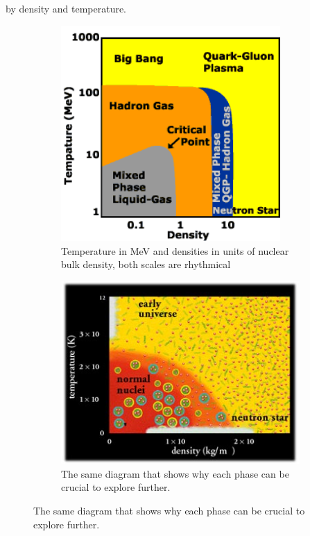 \documentclass[a4paper,12pt]{article}
\begin{document}
  by density and temperature.
 \begin{figure}[H]
\centering
\begin{subfigure}{.49\textwidth}
\centering
\includegraphics[width=0.92\textwidth]{cbm_phase1.png}
\caption{ Temperature in MeV and densities in units of nuclear bulk density, both scales are rhythmical }
\end{subfigure}
\begin{subfigure}{.49\textwidth}
\includegraphics[width=.92\textwidth]{cbm_phase2.jpg}
\caption{ The same diagram that shows why each phase can be crucial to explore further.  }
\end{subfigure}
\end{figure}
\end{document}
